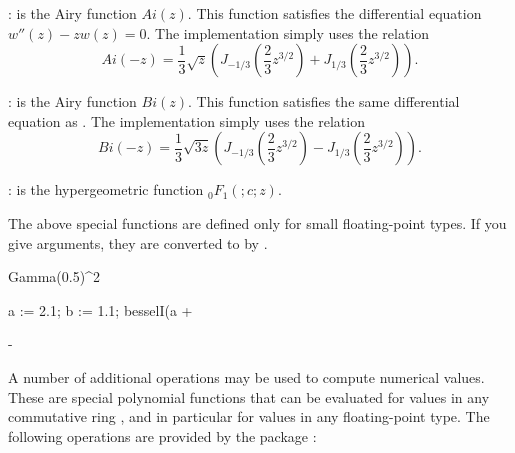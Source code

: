 {{{{{{{{{{{\noindent
{}: \hfill\newline
    is the Airy function $Ai(z)$.
   This function satisfies the differential equation
   $w''(z) - z w(z) = 0.$
   The implementation simply uses the relation
\begin{displaymath}
Ai(-z) = \frac{1}{3}\sqrt{z} ( J_{-1/3} (\frac{2}{3}z^{3/2}) + J_{1/3} (\frac{2}{3}z^{3/2}) ).
\end{displaymath}

\noindent
{}: \hfill\newline
    is the Airy function $Bi(z)$.
   This function satisfies the same differential equation as .
   The implementation simply uses the relation
\begin{displaymath}
Bi(-z) = \frac{1}{3}\sqrt{3 z} ( J_{-1/3} (\frac{2}{3}z^{3/2}) - J_{1/3} (\frac{2}{3}z^{3/2}) ).
\end{displaymath}

\noindent
{}: \hfill\newline
    is the hypergeometric function
   ${}_0 F_1 ( ; c; z)$.%

\begin{xtc}
\begin{xtccomment}
The above special functions are defined only for small floating-point types.
If you give  arguments, they are converted to
 by \Language{}.
\end{xtccomment}
\begin{spadsrc}
Gamma(0.5)^2
\end{spadsrc}
\begin{TeXOutput}
\begin{fricasmath}{5}
%
\end{fricasmath}
\end{TeXOutput}
\end{xtc}
\begin{xtc}
\begin{xtccomment}
\end{xtccomment}
\begin{spadsrc}
a := 2.1; b := 1.1; besselI(a + %
\end{spadsrc}
\begin{TeXOutput}
\begin{fricasmath}{6}
-{\TIMES \ImaginaryI }%
\end{fricasmath}
\end{TeXOutput}
\end{xtc}
%
A number of additional operations may be used to compute numerical values.
These are special polynomial functions that can be evaluated for values in
any commutative ring , and in particular for values in any
floating-point type.
The following operations are provided by the package
:

}}}}}}}}}}}
